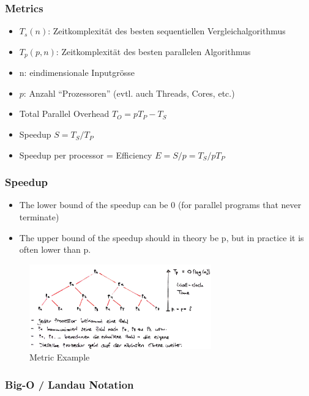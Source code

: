 \hypertarget{metrics}{%
\subsubsection{Metrics}\label{metrics}}

\begin{itemize}
\tightlist
\item
  $T_s(n)$: Zeitkomplexität des besten sequentiellen Vergleichalgorithmus
\item
  $T_p(p,n)$: Zeitkomplexität des besten parallelen Algorithmus
\item
  n: eindimensionale Inputgrösse
\item
  $p$: Anzahl ``Prozessoren'' (evtl. auch Threads, Cores, etc.)
\item
  Total Parallel Overhead $T_O = pT_P - T_S$
\item
  Speedup $S = T_S / T_P$
\item
  Speedup per processor = Efficiency $E = S / p = T_S / pT_P$
\end{itemize}

\hypertarget{speedup}{%
\subsubsection{Speedup}\label{speedup}}

\begin{itemize}
\tightlist
\item
  The lower bound of the speedup can be 0 (for parallel programs that
  never terminate)
\item
  The upper bound of the speedup should in theory be p, but in practice
  it is often lower than p.
\end{itemize}

\begin{figure}[H]
\centering
\includegraphics[width=0.7\textwidth]{figures/metricExample.png}
\caption{Metric Example}
\end{figure}

\hypertarget{big-o-landau-notation}{%
\subsubsection{Big-O / Landau Notation}\label{big-o-landau-notation}}

